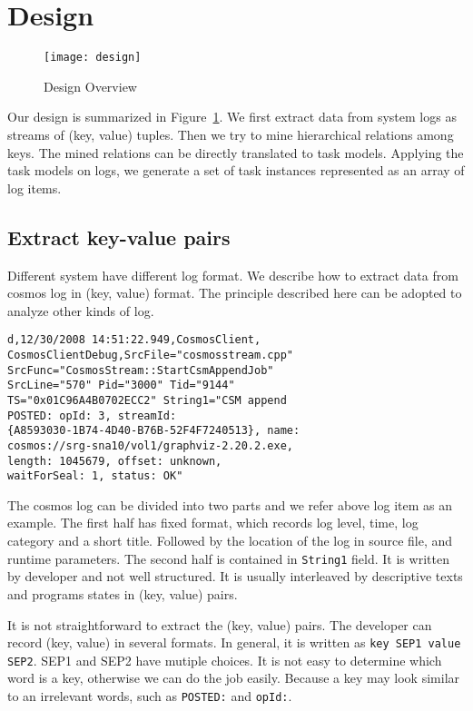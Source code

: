 
\section{Design}
\label{sec:design}

\begin{figure}
\centering
\texttt{[image: design]}
\caption{Design Overview}
\label{fig:design}
\end{figure}

Our design is summarized in Figure~\ref{fig:design}. We
first extract data from system logs as streams of (key,
value) tuples. Then we try to mine hierarchical relations
among keys. The mined relations can be directly translated
to task models. Applying the task models on logs, we
generate a set of task instances represented as an array of
log items.

\subsection{Extract key-value pairs}

Different system have different log format. We describe how
to extract data from cosmos log in (key, value) format. The
principle described here can be adopted to analyze 
other kinds of log.

\begin{verbatim}
d,12/30/2008 14:51:22.949,CosmosClient,
CosmosClientDebug,SrcFile="cosmosstream.cpp"
SrcFunc="CosmosStream::StartCsmAppendJob" 
SrcLine="570" Pid="3000" Tid="9144"
TS="0x01C96A4B0702ECC2" String1="CSM append
POSTED: opId: 3, streamId:
{A8593030-1B74-4D40-B76B-52F4F7240513}, name:
cosmos://srg-sna10/vol1/graphviz-2.20.2.exe,
length: 1045679, offset: unknown,
waitForSeal: 1, status: OK"
\end{verbatim}

The cosmos log can be divided into two parts and we refer
above log item as an example. The first half has fixed
format, which records log level, time, log category and a
short title. Followed by the location of the log in source
file, and runtime parameters. The second half is contained
in \texttt{String1} field. It is written by developer and 
not well structured. It is usually interleaved by 
descriptive texts and programs states in (key, value) pairs.

It is not straightforward to extract the (key, value) pairs.
The developer can record (key, value) in several formats. In
general, it is written as \texttt{key SEP1 value
SEP2}. SEP1 and SEP2 have mutiple choices.
It is not easy to determine which word is a key, otherwise
we can do the job easily. Because a key may look similar to
an irrelevant words, such as \texttt{POSTED:} and
\texttt{opId:}.

